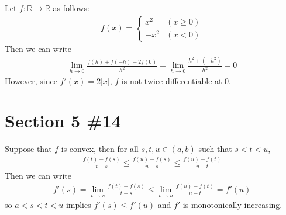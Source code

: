 \documentclass{scrartcl}
\begin{document}
Let \(f : \mathbb{R} \to \mathbb{R}\) as follows:
\begin{align*}
  f(x) = \begin{cases}
    x^2 & (x \geq 0) \\
    -x^2 & (x < 0)
  \end{cases}
\end{align*}
Then we can write
\begin{align*}
  \lim_{h \to 0} \frac{f(h) + f(-h) - 2f(0)}{h^2}
  = \lim_{h \to 0} \frac{h^2 + (-h^2)}{h^2} = 0
\end{align*}
However, since \(f'(x) = 2|x|\), \(f\) is not twice differentiable at 0.

\section{Section 5 \#14}
Suppose that \(f\) is convex, then for all \(s, t, u \in (a, b)\) such that \(s < t < u\),
\begin{align*}
  \frac{f(t) - f(s)}{t - s} \leq \frac{f(u) - f(s)}{u - s} \leq \frac{f(u) - f(t)}{u - t}
\end{align*}
Then we can write
\begin{align*}
  f'(s) = \lim_{t \to s} \frac{f(t) - f(s)}{t - s} \leq \lim_{t \to u} \frac{f(u) - f(t)}{u - t} = f'(u)
\end{align*}
so \(a < s < t < u\) implies \(f'(s) \leq f'(u)\) and \(f'\) is monotonically increasing.
\end{document}
